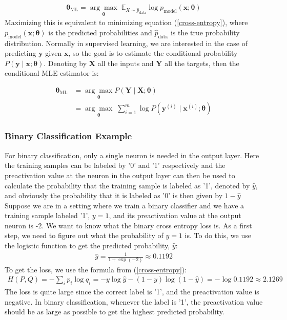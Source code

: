 \begin{align*}
    \boldsymbol{\theta}_{\text{ML}} = \underset{\boldsymbol{\theta}}{\arg \max} \; \mathbb{E}_{X \sim \hat{p}_{\text{data}}} \log p_{\text{model}} (\mathbf{x}; \boldsymbol{\theta})
\end{align*}
Maximizing this is equivalent to minimizing equation (\ref{cross-entropy}), where $p_{\text{model}}(\mathbf{x}; \boldsymbol{\theta})$ is the predicted probabilities and $\hat{p}_{\text{data}}$ is the true probability distribution. Normally in supervised learning, we are interested in the case of predicting $\mathbf{y}$ given $\mathbf{x}$, so the goal is to estimate the conditional probability $P(\mathbf{y} \mid \mathbf{x}; \boldsymbol{\theta})$. Denoting by $\mathbf{X}$ all the inputs and $\mathbf{Y}$ all the targets, then the conditional MLE estimator is:

\begin{align*}
    \boldsymbol{\theta}_{\text{ML}} &= \underset{\boldsymbol{\theta}}{\arg \max}P(\mathbf{Y} \mid \mathbf{X}; \boldsymbol{\theta}) \\
    & = \underset{\boldsymbol{\theta}}{\arg \max} \; \sum_{i=1} ^m \log P (\mathbf{y} ^{(i)} \mid \mathbf{x}^{(i)}; \boldsymbol{\theta})
\end{align*}





\subsubsection{Binary Classification Example}
For binary classification, only a single neuron is needed in the output layer. Here the training samples can be labeled by '0' and '1' respectively and the preactivation value at the neuron in the output layer can then be used to calculate the probability that the training sample is labeled as '1', denoted by $\hat{y}$, and obviously the probability that it is labeled as '0' is then given by $1 - \hat{y}$\\
\noindent Suppose we are in a setting where we train a binary classifier and we have a training sample labeled '1', $y=1$, and its preactivation value at the output neuron is -2. We want to know what the binary cross entropy loss is. As a first step, we need to figure out what the probability of $y = 1$ is. To do this, we use the logistic function to get the predicted probability, $\hat{y}$:
\begin{align*}
    \hat{y} = \frac{1}{1 + \exp(-2)} \approx 0.1192 
\end{align*}
To get the loss, we use the formula from (\ref{cross-entropy}):
\begin{align*}
    H(P,Q) = - \sum_i p_i \log q_i = -y \log \hat{y} - (1-y) \log(1-\hat{y}) = - \log{0.1192} \approx 2.1269
\end{align*}
The loss is quite large since the correct label is '1', and the preactivation value is negative. In binary classification, whenever the label is '1', the preactivation value should be as large as possible to get the highest predicted probability. 

